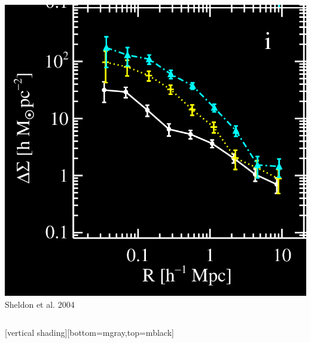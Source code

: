 \documentclass{beamer}
\begin{document}
{{\begin{columns}
\begin{column}{0.5\textwidth}
                \includegraphics[trim=0 0 5 8,clip,width=\textwidth]{deltasig_all_allband_bylum_icolor_crop.png}
                \newline
                {\color{gold}Sheldon et al. 2004}
            \end{column}
        \end{columns}
    }

    [vertical shading][bottom=mgray,top=mblack]
}
\end{document}
